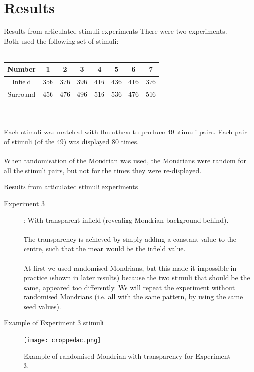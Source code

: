 \documentclass{beamer}
\begin{document}
\section{Results}
\begin{frame}[t]{Results from articulated stimuli experiments}
There were two experiments. \\Both used the following set of stimuli:\\
~\\
\begin{tabular}{c | c c c c c | c c}
Number & 1 & 2 & 3 & 4 & 5 & 6 & 7\\ \hline
Infield & 356 & 376 & 396 & 416 & 436 & 416 & 376\\ \hline
Surround & 456 & 476 & 496 & 516 & 536 & 476 & 516\\
\end{tabular}
\\
~\\
Each stimuli was matched with the others to produce 49 stimuli pairs. Each pair of stimuli (of the 49) was displayed 80 times.\\
~\\
When randomisation of the Mondrian was used, the Mondrians were random for all the stimuli pairs, but not for the times they were re-displayed.\\

\end{frame}
\begin{frame}[t]{Results from articulated stimuli experiments}

\begin{description}
\item[Experiment 3]:  With transparent infield (revealing Mondrian background behind).\\
~\\
The transparency is achieved by simply adding a constant value to the centre, such that the mean would be the infield value. \\
~\\
At first we used randomised Mondrians, but this made it impossible in practice (shown in later results) because the two stimuli that should be the same, appeared too differently. We will repeat the experiment without randomised Mondrians (i.e. all with the same pattern, by using the same seed values).\\
\end{description}
\end{frame}

\begin{frame}[t]{Example of Experiment 3 stimuli}
\begin{figure}[c]
\texttt{[image: croppedac.png]}
\caption{Example of randomised Mondrian with transparency for Experiment 3.}
\end{figure}
\end{frame}
\end{document}

